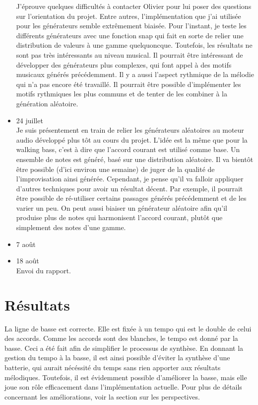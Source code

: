 \documentclass[letterpaper,12pt]{scrartcl}
\begin{document}
\begin{itemize}
	J'éprouve quelques difficultés à contacter Olivier pour lui poser des questions sur l'orientation du projet. Entre autres, l'implémentation que j'ai utilisée pour les générateurs semble extrêmement biaisée. Pour l'instant, je teste les différents générateurs avec une fonction snap qui fait en sorte de relier une distribution de valeurs à une gamme quelquoncque. Toutefois, les résultats ne sont pas très intéressants au niveau musical. Il pourrait être intéressant de développer des générateurs plus complexes, qui font appel à des motifs musicaux générés précédemment. Il y a aussi l'aspect rythmique de la mélodie qui n'a pas encore été travaillé. Il pourrait être possible d'implémenter les motifs rythmiques les plus communs et de tenter de les combiner à la génération aléatoire.
	\item 24 juillet\\
	Je suis présentement en train de relier les générateurs aléatoires au moteur audio développé plus tôt au cours du projet. L'idée est la même que pour la walking bass, c'est à dire que l'accord courant est utilisé comme base. Un ensemble de notes est généré, basé sur une distribution aléatoire. Il va bientôt être possible (d'ici environ une semaine) de juger de la qualité de l'improvisation ainsi générée. Cependant, je pense qu'il va falloir appliquer d'autres techniques pour avoir un résultat décent. Par exemple, il pourrait être possible de ré-utiliser certains passages générés précédemment et de les varier un peu. On peut aussi biaiser un générateur aléatoire afin qu'il produise plus de notes qui harmonisent l'accord courant, plutôt que simplement des notes d'une gamme.
	
	\item 7 août
	
	\item 18 août\\
	Envoi du rapport.
	
	\end{itemize}

	\section{Résultats}
	La ligne de basse est correcte. Elle est fixée à un tempo qui est le double de celui des accords. Comme les accords sont des blanches, le tempo est donné par la basse. Ceci a été fait afin de simplifier le processus de synthèse. En donnant la gestion du tempo à la basse, il est ainsi possible d'éviter la synthèse d'une batterie, qui aurait nécéssité du temps sans rien apporter aux résultats mélodiques. Toutefois, il est évidemment possible d'améliorer la basse, mais elle joue son rôle efficacement dans l'implémentation actuelle. Pour plus de détails concernant les améliorations, voir la section sur les perspectives. 
\end{document}
